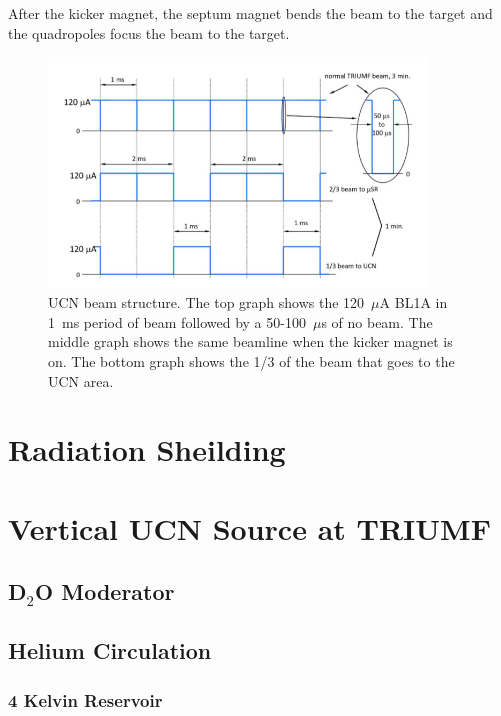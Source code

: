After the kicker magnet, the septum magnet bends the beam to the
target and the quadropoles focus the beam to the target.


\begin{figure}[h]
  \centering
  \includegraphics[width=0.9\textwidth]{bl1u.png}
  \caption{UCN beam structure. The top graph shows the 120~$\mu$A BL1A
    in 1~ms period of beam followed by a 50-100~$\mu$s of no
    beam. The middle graph shows the same beamline when the kicker
    magnet is on. The bottom graph shows the 1/3 of the beam that goes
    to the UCN area.}
  \label{fig:bl1u}
\end{figure}

\section{Radiation Sheilding}

\section{Vertical UCN Source at TRIUMF\label{sec:vertical_source}}


\subsection{D$_2$O Moderator}

\subsection{Helium Circulation}

\subsubsection{4 Kelvin Reservoir}


